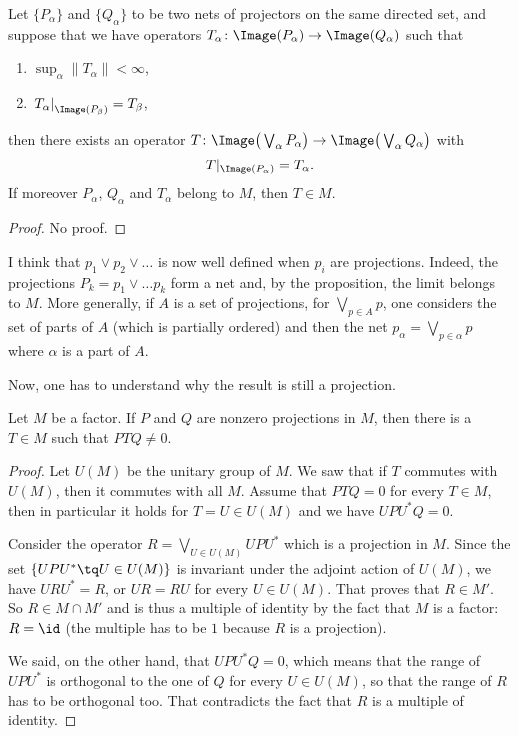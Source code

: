 \begin{proposition}
Let $\{ P_{\alpha} \}$ and $\{ Q_{\alpha} \}$ to be two nets of projectors on the same directed set, and suppose that we have operators $T_{\alpha}\colon \Image(P_{\alpha})\to \Image(Q_{\alpha})$ such that
\begin{enumerate}
\item $\sup_{\alpha}\| T_{\alpha} \|<\infty$,
\item $\left.T_{\alpha}\right|_{\Image(P_{\beta})}=T_{\beta}$,
\end{enumerate}
then there exists an operator $T\colon \Image\big(\bigvee_{\alpha} P_{\alpha}\big)\to \Image\big(\bigvee_{\alpha}Q_{\alpha}\big)$  with
\[ 
  T|_{\Image(P_{\alpha})}=T_{\alpha}.
\]
If moreover $P_{\alpha}$, $Q_{\alpha}$ and $T_{\alpha}$ belong to $M$, then $T\in M$.
\end{proposition}

\begin{proof}
No proof.
\end{proof}

\begin{probleme}
I think that $p_1\vee p_2\vee \ldots$ is now well defined when $p_i$ are projections. Indeed, the projections $P_k=p_1\vee \ldots p_k$ form a net and, by the proposition, the limit belongs to $M$. More generally, if $A$ is a set of projections, for $\bigvee_{p\in A}p$, one considers the set of parts of $A$ (which is partially ordered) and then the net $p_{\alpha}=\bigvee_{p\in\alpha}p$ where $\alpha$ is a part of $A$.

Now, one has to understand why the result is still a projection.
\end{probleme}


\begin{lemma}		\label{LemPTQnnzero}
Let $M$ be a factor. If $P$ and $Q$ are nonzero projections in $M$, then there is a $T\in M$ such that $PTQ\neq 0$.
\end{lemma}

\begin{proof}
Let $U(M)$ be the unitary group of $M$. We saw that if $T$ commutes with $U(M)$, then it commutes with all $M$. Assume that $PTQ=0$ for every $T\in M$, then in particular it holds for $T=U\in U(M)$ and we have $UPU^*Q=0$.

Consider the operator $R=\bigvee_{U\in U(M)}UPU^*$ which is a projection in $M$. Since the set $\{ UPU^*\tq U\in U(M) \}$ is invariant under the adjoint action of $U(M)$, we have $URU^*=R$, or $UR=RU$ for every $U\in U(M)$. That proves that $R\in M'$. So $R\in M\cap M'$ and is thus a multiple of identity by the fact that $M$ is a factor: $R=\id$ (the multiple has to be $1$ because $R$ is a projection).

We said, on the other hand, that $UPU^*Q=0$, which means that the range of $UPU^*$ is orthogonal to the one of $Q$ for every $U\in U(M)$, so that the range of $R$ has to be orthogonal too. That contradicts the fact that $R$ is a multiple of identity.
\end{proof}

